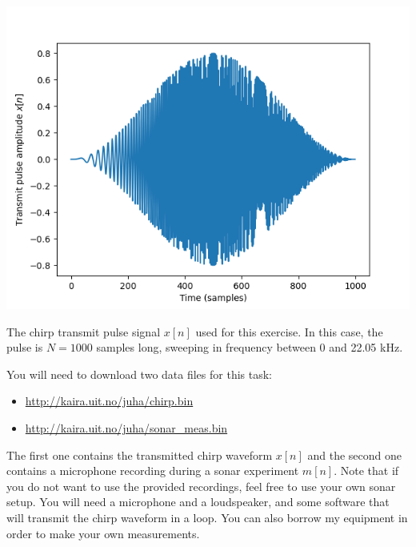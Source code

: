 \begin{marginfigure}
  \begin{center}
    \includegraphics[width=\textwidth]{Assignments/figures/chirp_tx.png}
  \end{center}
  \caption{The chirp transmit pulse signal $x[n]$ used for this exercise.
    In this case, the pulse is $N=1000$ samples long, sweeping in frequency between 0 and 22.05 kHz.}
  \label{fig:tx_pulse_chirp}
\end{marginfigure}

You will need to download two data files for this task:
\begin{itemize}
  \item \url{http://kaira.uit.no/juha/chirp.bin}
  \item \url{http://kaira.uit.no/juha/sonar_meas.bin}
\end{itemize}
The first one contains the transmitted chirp waveform $x[n]$ and the second one
contains a microphone recording during a sonar experiment $m[n]$. Note that
if you do not want to use the provided recordings, feel free to use
your own sonar setup. You will need a microphone and a loudspeaker, and
some software that will transmit the chirp waveform in a loop. You can
also borrow my equipment in order to make your own measurements.

